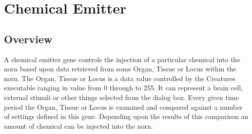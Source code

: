 \documentclass[11pt,twoside,a4paper]{article}
\begin{document}

\clearpage

\section{Chemical Emitter} %

\subsection{Overview}

A chemical emitter gene controls the injection of a particular chemical into the norn based upon data retrieved from some Organ, Tissue or Locus within the norn. The Organ, Tissue or Locus is a data value controlled by the Creatures executable ranging in value from 0 through to 255. It can represent a brain cell, external stimuli or other things selected from the dialog box. Every given time period the Organ, Tissue or Locus is examined and compared against a number of settings defined in this gene. Depending upon the results of this comparison an amount of chemical can be injected into the norn.~\\

\end{document}
